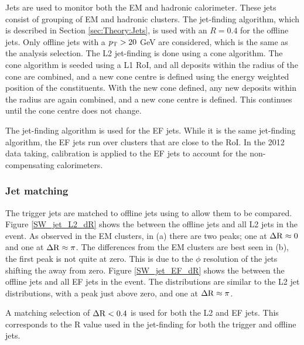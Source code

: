 Jets are used to monitor both the EM and hadronic calorimeter.
These jets consist of grouping of EM and hadronic clusters.
The \antikt{} jet-finding algorithm, which is described in Section \ref{sec:Theory:Jets}, is used with an $R=0.4$ for the offline jets.
Only offline jets with a $\mbox{$p_{\rm T}$}{}>20$ GeV are considered, which is the same as the analysis selection.
The L2 jet-finding is done using a cone algorithm.
The cone algorithm is seeded using a L1 RoI, and all deposits within the radius of the cone are combined, and a new cone centre is defined using the energy weighted position of the constituents.
With the new cone defined, any new deposits within the radius are again combined, and a new cone centre is defined.
This continues until the cone centre does not change.

The \antikt{} jet-finding algorithm is used for the EF jets. 
While it is the same jet-finding algorithm, the EF jets run over clusters that are close to the RoI.
In the 2012 data taking, calibration is applied to the EF jets to account for the non-compensating calorimeters. 

\subsubsection{Jet matching}

The trigger jets are matched to offline jets using \dr{} to allow them to be compared.
Figure \ref{SW_jet_L2_dR} shows the \dr{} between the offline jets and all L2 jets in the event.
As observed in the EM clusters, in (a) there are two peaks; one at $\mbox{$\Delta{\rm R}$}{}\approx0$ and one at $\mbox{$\Delta{\rm R}$}{}\approx\pi$.
The differences from the EM clusters are best seen in (b), the first peak is not quite at zero.
This is due to the $\phi$ resolution of the jets shifting the \dphi{} away from zero. 
Figure \ref{SW_jet_EF_dR} shows the \dr{} between the offline jets and all EF jets in the event.
The distributions are similar to the L2 jet \dr{} distributions, with a peak just above zero, and one at $\mbox{$\Delta{\rm R}$}{}\approx\pi$. 

A matching selection of $\mbox{$\Delta{\rm R}$}{}<0.4$ is used for both the L2 and EF jets.
This corresponds to the R value used in the jet-finding for both the trigger and offline jets.

